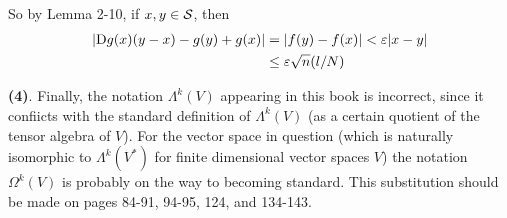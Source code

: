 So by Lemma 2-10, if $x,y\in\mathcal{S}$, then 
\begin{align*}
    |\mathrm{D}g(x)(y-x)-g(y)+g(x)|
    & = |f(y)-f(x)|<\varepsilon|x-y|\\
    & \le \varepsilon\sqrt{n}(l/N)
\end{align*}

\vspace*{3em}
\textbf{(4)}. Finally, the notation $\Lambda^k(V)$ appearing in this book is
incorrect, since it confiicts with the standard definition of
$\Lambda^k(V)$ (as a certain quotient of the tensor algebra of $V$).
For the vector space in question (which is naturally isomorphic to
$\Lambda^k(V^*)$ for finite dimensional vector spaces $V$) the notation
$\Omega^k(V)$ is probably on the way to becoming standard. This
substitution should be made on pages 84-91, 94-95, 124, and 134-143.
